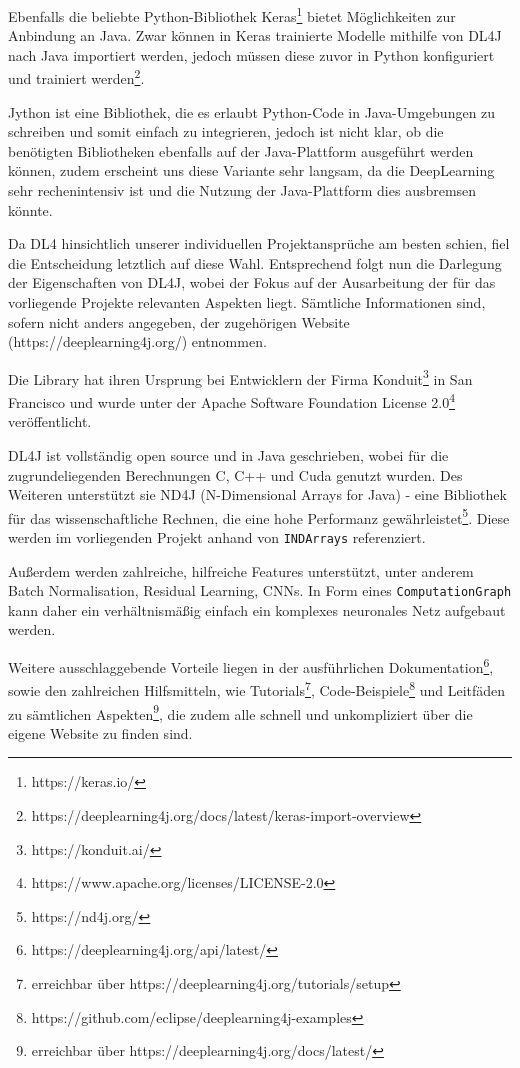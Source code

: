 \documentclass[12pt,a4paper]{article}
\begin{document}
Ebenfalls die beliebte Python-Bibliothek Keras\footnote{https://keras.io/} bietet Möglichkeiten zur Anbindung an Java. Zwar können in Keras trainierte Modelle mithilfe von DL4J nach Java importiert werden, jedoch müssen diese zuvor in Python konfiguriert und trainiert werden\footnote{https://deeplearning4j.org/docs/latest/keras-import-overview}.

Jython ist eine Bibliothek, die es erlaubt Python-Code in Java-Umgebungen zu schreiben und somit einfach zu integrieren, jedoch ist nicht klar, ob die benötigten Bibliotheken ebenfalls auf der Java-Plattform ausgeführt werden können, zudem erscheint uns diese Variante sehr langsam, da die DeepLearning sehr rechenintensiv ist und die Nutzung der Java-Plattform dies ausbremsen könnte.

Da DL4 hinsichtlich unserer individuellen Projektansprüche am besten schien, fiel die Entscheidung letztlich auf diese Wahl. Entsprechend folgt nun die Darlegung der Eigenschaften von DL4J, wobei der Fokus auf der Ausarbeitung der für das vorliegende Projekte relevanten Aspekten liegt. Sämtliche Informationen sind, sofern nicht anders angegeben, der zugehörigen Website (https://deeplearning4j.org/) entnommen.

Die Library hat ihren Ursprung bei Entwicklern der Firma Konduit\footnote{https://konduit.ai/} in San Francisco und wurde unter der Apache Software Foundation License 2.0\footnote{https://www.apache.org/licenses/LICENSE-2.0} veröffentlicht.

DL4J ist vollständig open source und in Java geschrieben, wobei für die zugrundeliegenden Berechnungen C, C++ und Cuda genutzt wurden. Des Weiteren unterstützt sie ND4J (N-Dimensional Arrays for Java) - eine Bibliothek für das wissenschaftliche Rechnen, die eine hohe Performanz gewährleistet\footnote{https://nd4j.org/}. Diese werden im vorliegenden Projekt anhand von \texttt{INDArrays} referenziert.

Außerdem werden zahlreiche, hilfreiche Features unterstützt, unter anderem Batch Normalisation, Residual Learning, CNNs. In Form eines \texttt{ComputationGraph} kann daher ein verhältnismäßig einfach ein komplexes neuronales Netz aufgebaut werden.

Weitere ausschlaggebende Vorteile liegen in der ausführlichen Dokumentation\footnote{https://deeplearning4j.org/api/latest/}, sowie den zahlreichen Hilfsmitteln, wie Tutorials\footnote{erreichbar über https://deeplearning4j.org/tutorials/setup}, Code-Beispiele\footnote{https://github.com/eclipse/deeplearning4j-examples} und Leitfäden zu sämtlichen Aspekten\footnote{erreichbar über https://deeplearning4j.org/docs/latest/}, die zudem alle schnell und unkompliziert über die eigene Website zu finden sind.
\end{document}
